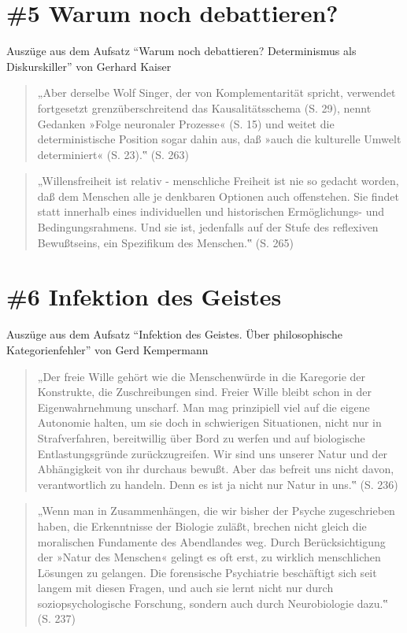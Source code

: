 \documentclass[
  a4paper,
]{report}
\begin{document}
\hypertarget{def-ev5}{%
\section{\#5 Warum noch debattieren?}\label{def-ev5}}

Auszüge aus dem Aufsatz ``Warum noch debattieren? Determinismus als Diskurskiller'' von Gerhard Kaiser \citeyearpar{Kaiser2004}

\begin{quote}
„Aber derselbe Wolf Singer, der von Komplementarität spricht, verwendet fortgesetzt grenzüberschreitend das Kausalitätsschema (S. 29), nennt Gedanken »Folge neuronaler Prozesse« (S. 15) und weitet die deterministische Position sogar dahin aus, daß »auch die kulturelle Umwelt determiniert« (S. 23).‟ (S. 263)
\end{quote}

\begin{quote}
„Willensfreiheit ist relativ - menschliche Freiheit ist nie so gedacht worden, daß dem Menschen alle je denkbaren Optionen auch offenstehen. Sie findet statt innerhalb eines individuellen und historischen Ermöglichungs- und Bedingungsrahmens. Und sie ist, jedenfalls auf der Stufe des reflexiven Bewußtseins, ein Spezifikum des Menschen.‟ (S. 265)
\end{quote}

\hypertarget{def-ev6}{%
\section{\#6 Infektion des Geistes}\label{def-ev6}}

Auszüge aus dem Aufsatz ``Infektion des Geistes. Über philosophische Kategorienfehler'' von Gerd Kempermann \citeyearpar{Kempermann2004}

\begin{quote}
„Der freie Wille gehört wie die Menschenwürde in die Karegorie der Konstrukte, die Zuschreibungen sind. Freier Wille bleibt schon in der Eigenwahrnehmung unscharf. Man mag prinzipiell viel auf die eigene Autonomie halten, um sie doch in schwierigen Situationen, nicht nur in Strafverfahren, bereitwillig über Bord zu werfen und auf biologische Entlastungsgründe zurückzugreifen. Wir sind uns unserer Natur und der Abhängigkeit von ihr durchaus bewußt. Aber das befreit uns nicht davon, verantwortlich zu handeln. Denn es ist ja nicht nur Natur in uns.‟ (S. 236)
\end{quote}

\begin{quote}
„Wenn man in Zusammenhängen, die wir bisher der Psyche zugeschrieben haben, die Erkenntnisse der Biologie zuläßt, brechen nicht gleich die moralischen Fundamente des Abendlandes weg. Durch Berücksichtigung der »Natur des Menschen« gelingt es oft erst, zu wirklich menschlichen Lösungen zu gelangen. Die forensische Psychiatrie beschäftigt sich seit langem mit diesen Fragen, und auch sie lernt nicht nur durch soziopsychologische Forschung, sondern auch durch Neurobiologie dazu.‟ (S. 237)
\end{quote}
\end{document}
